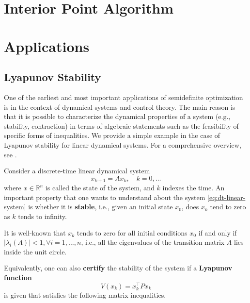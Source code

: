 \documentclass[
]{book}
\theoremstyle{definition}
\theoremstyle{definition}
\theoremstyle{definition}
\theoremstyle{definition}
\theoremstyle{remark}
\begin{document}
\hypertarget{interior-point-algorithm}{%
\section{Interior Point Algorithm}\label{interior-point-algorithm}}

\hypertarget{applications}{%
\section{Applications}\label{applications}}

\hypertarget{lyapunov-stability}{%
\subsection{Lyapunov Stability}\label{lyapunov-stability}}

One of the earliest and most important applications of semidefinite optimization is in the context of dynamical systems and control theory. The main reason is that it is possible to characterize the dynamical properties of a system (e.g., stability, contraction) in terms of algebraic statements such as the feasibility of specific forms of inequalities. We provide a simple example in the case of Lyapunov stability for linear dynamical systems. For a comprehensive overview, see \citep{boyd94book-lmi}.

Consider a discrete-time linear dynamical system
\begin{equation}
x_{k+1} = A x_k,\quad k=0,\dots
\label{eq:dt-linear-system}
\end{equation}
where \(x \in \mathbb{R}^{n}\) is called the state of the system, and \(k\) indexes the time. An important property that one wants to understand about the system \eqref{eq:dt-linear-system} is whether it is \textbf{stable}, i.e., given an initial state \(x_0\), does \(x_k\) tend to zero as \(k\) tends to infinity.

It is well-known that \(x_k\) tends to zero for all initial conditions \(x_0\) if and only if \(|\lambda_i(A)| < 1, \forall i=1,\dots,n\), i.e., all the eigenvalues of the transition matrix \(A\) lies inside the unit circle.

Equivalently, one can also \textbf{certify} the stability of the system if a \textbf{Lyapunov function}
\begin{equation}
V(x_k) = x_k^\top P x_k
\label{eq:Lyapunov-function}
\end{equation}
is given that satisfies the following matrix inequalities.
\end{document}
